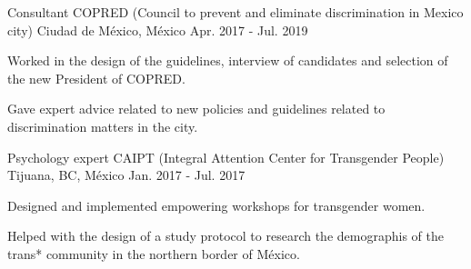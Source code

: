 \vspace{-3.2mm}
\begin{cventries}
    \cventry
        {Consultant}
        {COPRED (Council to prevent and eliminate discrimination in Mexico city)}
        {Ciudad de México, México}
        {Apr. 2017 - Jul. 2019}
        {
            \begin{cvitems}
                \item {Worked in the design of the guidelines, interview of candidates and selection of the new President of COPRED.}
                \item {Gave expert advice related to new policies and guidelines related to discrimination matters in the city.}
            \end{cvitems}
        }
    \cventry
        {Psychology expert}
        {CAIPT (Integral Attention Center for Transgender People)}
        {Tijuana, BC, México}
        {Jan. 2017 - Jul. 2017}
        {
            \begin{cvitems}
                \item {Designed and implemented empowering workshops for transgender women.}
                \item {Helped with the design of a study protocol to research the demographis of the trans* community in the northern border of México.}
            \end{cvitems}
        }
\end{cventries}
